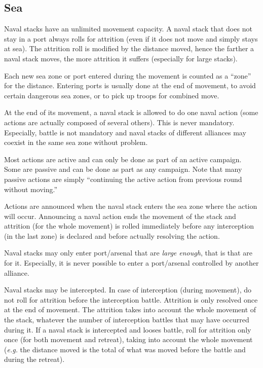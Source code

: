 \subsection{Sea}
Naval stacks have an unlimited movement capacity. A naval stack that does not
stay in a port always rolls for attrition (even if it does not move and simply
stays at sea). The attrition roll is modified by the distance moved, hence the
farther a naval stack moves, the more attrition it suffers (especially for
large stacks).

Each new sea zone or port entered during the movement is counted as a ``zone''
for the distance. Entering ports is usually done at the end of movement, to
avoid certain dangerous sea zones, or to pick up troops for combined move.

At the end of its movement, a naval stack is allowed to do one naval action
(some actions are actually composed of several others). This is never
mandatory. Especially, battle is not mandatory and naval stacks of different
alliances may coexist in the same sea zone without problem.

Most actions are active and can only be done as part of an active
campaign. Some are passive and can be done as part as any campaign. Note that
many passive actions are simply ``continuing the active action from previous
round without moving.''

Actions are announced when the naval stack enters the sea zone where the
action will occur. Announcing a naval action ends the movement of the stack
and attrition (for the whole movement) is rolled immediately before any
interception (in the last zone) is declared and before actually resolving the
action.

Naval stacks may only enter port/arsenal that are \emph{large enough}, that is
that are \SoS for it. Especially, it is never possible to enter a port/arsenal
controlled by another alliance.

Naval stacks may be intercepted. In case of interception (during movement), do
not roll for attrition before the interception battle. Attrition is only
resolved once at the end of movement. The attrition takes into account the
whole movement of the stack, whatever the number of interception battles that
may have occurred during it. If a naval stack is intercepted and looses
battle, roll for attrition only once (for both movement and retreat), taking
into account the whole movement (\emph{e.g.} the distance moved is the total
of what was moved before the battle and during the retreat).

